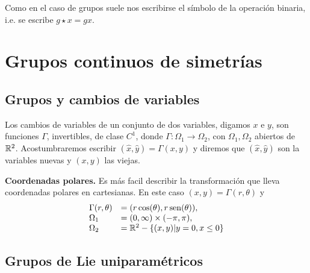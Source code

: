 Como en el caso de grupos suele nos escribirse el símbolo de la operación binaria, i.e. se escribe $g\star x= gx$.




\section{Grupos continuos de simetrías}

\subsection{Grupos y cambios de variables}

Los cambios de variables de un conjunto de dos variables, digamos $x$ e $y$, son funciones $\Gamma$, invertibles,  de clase $C^1$, donde $\Gamma:\Omega_1\to\Omega_2$, con $\Omega_1,\Omega_2$ abiertos de $\mathbb{R}^2$.  Acostumbraremos escribir $(\hat{x},\hat{y})=\Gamma(x,y)$ y diremos que $(\hat{x},\hat{y})$ son la variables nuevas y $(x,y)$ las viejas.

\begin{ejemplo} \textbf{Coordenadas polares.} Es más facil describir la transformación que lleva coordenadas polares en cartesianas. En este caso $(x,y)=\Gamma(r,\theta)$ y
\[
\begin{array}{ll}
\Gamma(r,\theta)&=(r\cos(\theta),r\operatorname{sen}(\theta)),\\
\Omega_1&=(0,\infty)\times (-\pi,\pi),\\
\Omega_2&=\mathbb{R}^2-\{(x,y)|y=0,x\leq 0\}\\
\end{array}
\]
\end{ejemplo}

\subsection{Grupos de Lie uniparamétricos}

